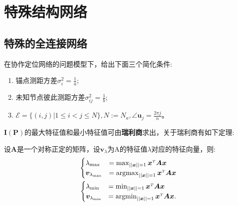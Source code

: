 \chapter{特殊结构网络}\label{cha:content4}
\section{特殊的全连接网络}\label{section:complete_graph_cooperation}
在协作定位网络的问题模型下，给出下面三个简化条件:
\begin{enumerate}
\item 锚点测距方差$\sigma_i^2=\frac{1}{a}$;
\item 未知节点彼此测距方差$\sigma^2_{ij}=\frac{1}{b}$;
\item $\mathcal{E}=\{(i,j)|1\leq i <j\leq N\},N:=N_a,\angle\bm{u}_j=\frac{2\pi j}{n}$。
\end{enumerate}
$\bm{I}(\bm{P})$的最大特征值和最小特征值可由\textbf{瑞利商}求出，关于瑞利商有如下定理:
\begin{theorem}\label{theorem:rayleigh}
  设$\bm{A}$是一个对称正定的矩阵，设$\bm{v}_{\lambda}$为A的特征值$\lambda$对应的特征向量，则:
\begin{align*}
\begin{cases}
\lambda_{\text{max}}&=\max_{||\bm{x}||=1} \bm{x}^{\scriptscriptstyle T}\bm{A}\bm{x}\\
\bm{v}_{\lambda_{\text{max}}}&=\operatorname*{argmax}_{||\bm{x}||=1} \bm{x}^{\scriptscriptstyle T}\bm{A}\bm{x}
\end{cases}\\
\begin{cases}
\lambda_{\text{min}}&=\min_{||\bm{x}||=1} \bm{x}^{\scriptscriptstyle T}\bm{A}\bm{x}\\
\bm{v}_{\lambda_{\text{min}}}&=\operatorname*{argmin}_{||\bm{x}||=1} \bm{x}^{\scriptscriptstyle T}\bm{A}\bm{x}.
\end{cases}
\end{align*}
\end{theorem}

